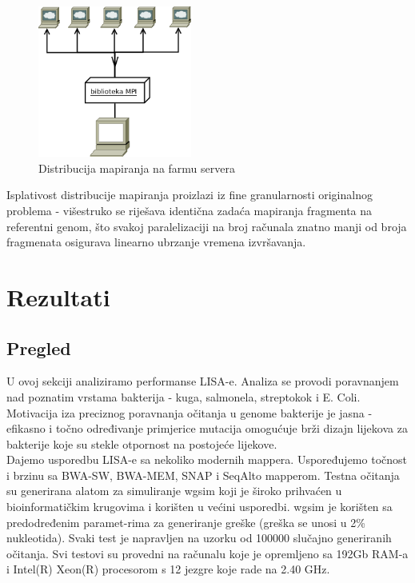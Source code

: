\documentclass[times, utf8, diplomski]{fer}
\begin{document}
\begin{figure}[H]
\begin{center}
	\includegraphics[width=0.45\textwidth]{../img/MPI.png}
	\caption{Distribucija mapiranja na farmu servera}
\end{center}
\end{figure}

Isplativost distribucije mapiranja proizlazi iz fine granularnosti originalnog problema - višestruko se riješava identična zadaća mapiranja fragmenta na referentni genom, što svakoj paralelizaciji na broj računala znatno manji od broja fragmenata osigurava linearno ubrzanje vremena izvršavanja.

\chapter{Rezultati}

\section {Pregled}
U ovoj sekciji analiziramo performanse LISA-e. Analiza se provodi poravnanjem nad poznatim vrstama bakterija - kuga, salmonela, streptokok i E. Coli. Motivacija iza preciznog poravnanja očitanja u genome bakterije je jasna - efikasno i točno određivanje primjerice mutacija omogućuje brži dizajn lijekova za bakterije koje su stekle otpornost na postojeće lijekove.\\
Dajemo usporedbu LISA-e sa nekoliko modernih mappera. Uspoređujemo točnost i brzinu sa BWA-SW, BWA-MEM\cite{Li:2010:FAL:1741823.1741825}, SNAP i SeqAlto mapperom. Testna očitanja su generirana alatom za simuliranje wgsim koji je široko prihvaćen u bioinformatičkim krugovima i korišten u većini usporedbi. wgsim je korišten sa predodređenim paramet-rima za generiranje greške (greška se unosi u 2\% nukleotida). Svaki test je napravljen na uzorku od 100000 slučajno generiranih očitanja. 
Svi testovi su provedni na računalu koje je opremljeno sa 192Gb RAM-a i Intel(R) Xeon(R) procesorom s 12 jezgre koje rade na 2.40 GHz. 
\end{document}
